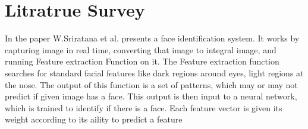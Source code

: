 \section{Litratrue Survey}
In the paper \cite{opencv} W.Sriratana et al. presents a face identification system. It works by capturing image in real time, converting that image to integral image,
and running Feature extraction Function on it. The Feature extraction function searches for standard facial features like dark regions around eyes, light regions at the nose. The output of this function
is a set of patterns, which may or may not predict if given image has a face. This output is then input to a neural network, which is trained to identify if there is a face. Each feature vector is given its weight according to its aility to predict a feature


